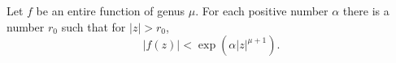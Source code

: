 Let $f$ be an entire function of genus $\mu$. For each positive number $\alpha$ there is a number $r_0$ such that for $|z| > r_0$,
$$|f(z)| < \exp(\alpha |z|^{\mu+1}).$$
